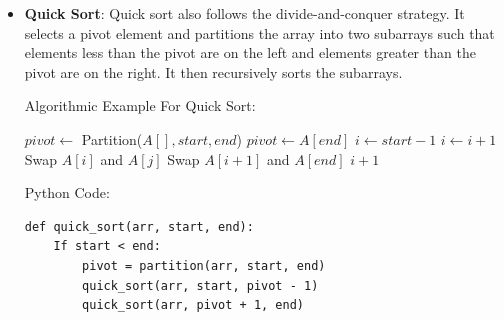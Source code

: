 \documentclass[12pt]{book} %
\begin{document}
\begin{itemize}
\begin{verbatim}
        While i < len(L):
            arr[k] = L[i]
            i += 1
            k += 1

        While j < len(R):
            arr[k] = R[j]
            j += 1
            k += 1
\end{verbatim}
    \FloatBarrier %
    \item \textbf{Quick Sort}: Quick sort also follows the divide-and-conquer strategy. It selects a pivot element and partitions the array into two subarrays such that elements less than the pivot are on the left and elements greater than the pivot are on the right. It then recursively sorts the subarrays.

Algorithmic Example For Quick Sort:
     \FloatBarrier %
    \begin{algorithm}
\caption{Quick Sort}
\begin{algorithmic}[1]
        \State $pivot \gets$ Partition($A[], start, end$)
        \State {}
        \State {}
    \EndIf
\EndFunction
\FloatBarrier %
    \State $pivot \gets A[end]$
    \State $i \gets start - 1$
            \State $i \gets i + 1$
            \State Swap $A[i]$ and $A[j]$
        \EndIf
    \EndFor
    \State Swap $A[i + 1]$ and $A[end]$
    \State \Return $i + 1$
\EndFunction
\end{algorithmic}
\end{algorithm}
\FloatBarrier %
Python Code:
\begin{verbatim}
def quick_sort(arr, start, end):
    If start < end:
        pivot = partition(arr, start, end)
        quick_sort(arr, start, pivot - 1)
        quick_sort(arr, pivot + 1, end)


\end{verbatim}
\end{itemize}
\end{document}

